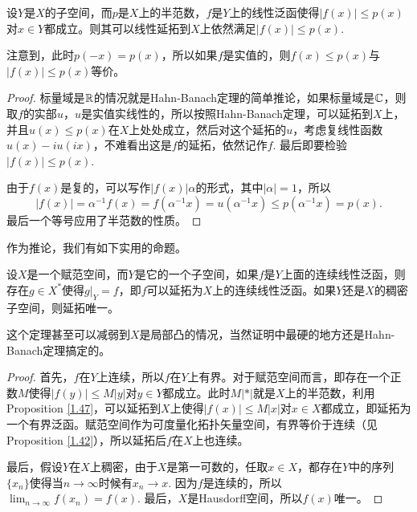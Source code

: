 \begin{pro}\label{1.47}
	设$Y$是$X$的子空间，而$p$是$X$上的半范数，$f$是$Y$上的线性泛函使得$|f(x)|\leq p(x)$对$x\in Y$都成立。则其可以线性延拓到$X$上依然满足$|f(x)|\leq p(x)$.
\end{pro}

注意到，此时$p(-x)=p(x)$，所以如果$f$是实值的，则$f(x)\leq p(x)$与$|f(x)|\leq p(x)$等价。

\begin{proof}
	标量域是$\mathbb{R}$的情况就是Hahn-Banach定理的简单推论，如果标量域是$\mathbb{C}$，则取$f$的实部$u$，$u$是实值实线性的，所以按照Hahn-Banach定理，可以延拓到$X$上，并且$u(x)\leq p(x)$在$X$上处处成立，然后对这个延拓的$u$，考虑复线性函数$u(x)-i u(i x)$，不难看出这是$f$的延拓，依然记作$f$. 最后即要检验$|f(x)|\leq p(x)$.

	由于$f(x)$是复的，可以写作$|f(x)|\alpha$的形式，其中$|\alpha|=1$，所以
	\[
	|f(x)|=\alpha^{-1}f(x)=f(\alpha^{-1}x)=u(\alpha^{-1}x)\leq p(\alpha^{-1}x)=p(x).
	\]
	最后一个等号应用了半范数的性质。
\end{proof}

作为推论，我们有如下实用的命题。

\begin{pro}\label{1.52}
	设$X$是一个赋范空间，而$Y$是它的一个子空间，如果$f$是$Y$上面的连续线性泛函，则存在$g\in X^*$使得$g|_Y=f$，即$f$可以延拓为$X$上的连续线性泛函。如果$Y$还是$X$的稠密子空间，则延拓唯一。
\end{pro}

这个定理甚至可以减弱到$X$是局部凸的情况，当然证明中最硬的地方还是Hahn-Banach定理搞定的。

\begin{proof}
	首先，$f$在$Y$上连续，所以$f$在$Y$上有界。对于赋范空间而言，即存在一个正数$M$使得$|f(y)|\leq M|y|$对$y\in Y$都成立。此时$M|*|$就是$X$上的半范数，利用Proposition \ref{1.47}，可以延拓到$X$上使得$|f(x)|\leq M|x|$对$x\in X$都成立，即延拓为一个有界泛函。赋范空间作为可度量化拓扑矢量空间，有界等价于连续（见Proposition \ref{1.42}），所以延拓后$f$在$X$上也连续。

	最后，假设$Y$在$X$上稠密，由于$X$是第一可数的，任取$x\in X$，都存在$Y$中的序列$\{x_n\}$使得当$n\to\infty$时候有$x_n\to x$. 因为$f$是连续的，所以$\lim_{n\to\infty}f(x_n)=f(x)$. 最后，$X$是Hausdorff空间，所以$f(x)$唯一。
\end{proof}


